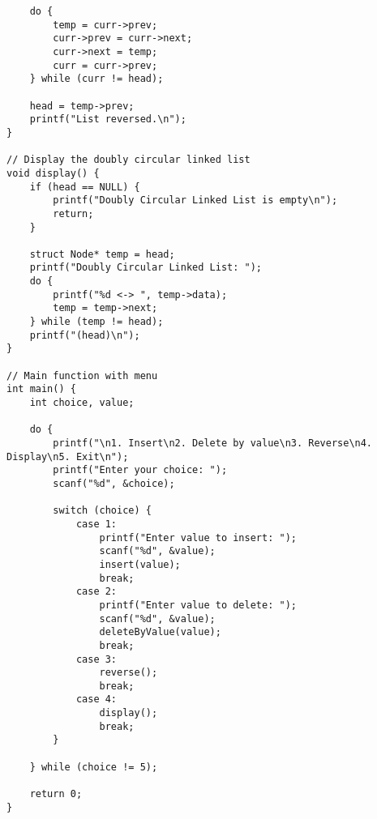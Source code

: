 \documentclass[12pt,a4paper]{article}
\begin{document}
\begin{lstlisting}
    do {
        temp = curr->prev;
        curr->prev = curr->next;
        curr->next = temp;
        curr = curr->prev;
    } while (curr != head);

    head = temp->prev;
    printf("List reversed.\n");
}

// Display the doubly circular linked list
void display() {
    if (head == NULL) {
        printf("Doubly Circular Linked List is empty\n");
        return;
    }

    struct Node* temp = head;
    printf("Doubly Circular Linked List: ");
    do {
        printf("%d <-> ", temp->data);
        temp = temp->next;
    } while (temp != head);
    printf("(head)\n");
}

// Main function with menu
int main() {
    int choice, value;

    do {
        printf("\n1. Insert\n2. Delete by value\n3. Reverse\n4. Display\n5. Exit\n");
        printf("Enter your choice: ");
        scanf("%d", &choice);

        switch (choice) {
            case 1:
                printf("Enter value to insert: ");
                scanf("%d", &value);
                insert(value);
                break;
            case 2:
                printf("Enter value to delete: ");
                scanf("%d", &value);
                deleteByValue(value);
                break;
            case 3:
                reverse();
                break;
            case 4:
                display();
                break;
        }

    } while (choice != 5);

    return 0;
}
\end{lstlisting}



\newpage
\end{document}
